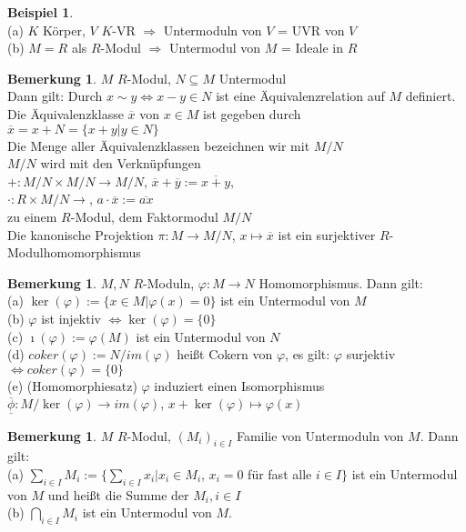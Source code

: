 \documentclass[10pt,a4paper,numbers=endperiod]{scrartcl}
\theoremstyle{definition}
\newtheorem{bem}[satz]{Bemerkung}
\newtheorem{bsp}[satz]{Beispiel}
\begin{document}
\begin{bsp}
	$ $\\
	(a) $K$ Körper, $V$ $K$-VR $\Rightarrow$ Untermoduln von $V$ = UVR von $V$\\
	(b) $M = R$ als $R$-Modul $\Rightarrow$ Untermodul von $M$ = Ideale in $R$
\end{bsp}

\begin{bem}
	$M$ $R$-Modul, $N \subseteq M$ Untermodul\\
	Dann gilt: Durch $x \sim y \Leftrightarrow x - y \in N$ ist eine Äquivalenzrelation auf $M$ definiert.\\
	Die Äquivalenzklasse $\overline{x}$ von $x \in M$ ist gegeben durch\\
	$\overline{x} = x + N = \{x +y | y \in N\}$\\
	Die Menge aller Äquivalenzklassen bezeichnen wir mit $M/N$\\
	$M/N$ wird mit den Verknüpfungen\\
	$+: M/N \times M/N \rightarrow M/N$, $\overline{x} + \overline{y} := \overline{x+y}$,\\
	$\cdot: R \times M/N \rightarrow$, $a \cdot \overline{x} := \overline{ax}$\\
	zu einem $R$-Modul, dem Faktormodul $M/N$\\
	Die kanonische Projektion $\pi: M \rightarrow M/N$, $x \mapsto \overline{x}$ ist ein surjektiver $R$-Modulhomomorphismus
\end{bem}

\begin{bem}
	$M, N$ $R$-Moduln, $\varphi: M \rightarrow N$ Homomorphismus. Dann gilt:\\
	(a) $\ker(\varphi) := \{x \in M| \varphi(x) = 0\}$ ist ein Untermodul von $M$\\
	(b) $\varphi$ ist injektiv $\Leftrightarrow \ker(\varphi) = \{0\}$\\
	(c) $\imath(\varphi) := \varphi(M)$ ist ein Untermodul von $N$\\
	(d) $coker(\varphi) := N/im(\varphi)$ heißt Cokern von $\varphi$, es gilt: $\varphi$ surjektiv $\Leftrightarrow coker(\varphi) = \{0\}$\\
	(e) (Homomorphiesatz) $\varphi$ induziert einen Isomorphismus $\overline{\underline{\phi}}: M/\ker(\varphi) \rightarrow im(\varphi)$, $x + \ker(\varphi) \mapsto \varphi(x)$\\
\end{bem}

\begin{bem}
	$M$ $R$-Modul, $(M_i)_{i \in I}$ Familie von Untermoduln von $M$. Dann gilt:\\
	(a) $\sum\limits_{i \in I} M_i := \{\sum\limits_{i \in I} x_i| x_i \in M_i$, $x_i = 0$ für fast alle $i \in I\}$ ist ein Untermodul von $M$ und heißt die Summe der $M_i, i \in I$\\
	(b) $\bigcap\limits_{i \in I} M_i$ ist ein Untermodul von $M$.
\end{bem}
\end{document}
